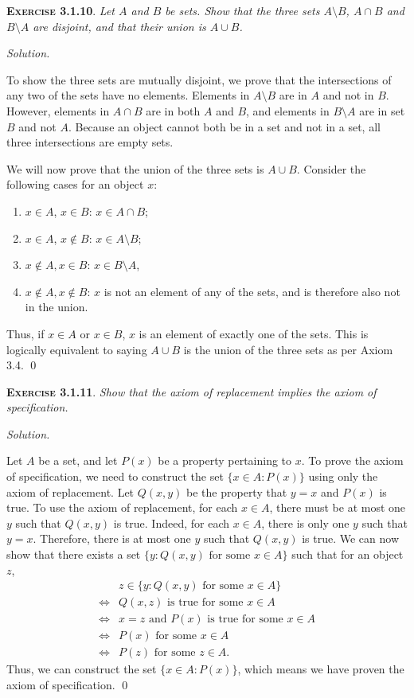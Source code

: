 \documentclass[12pt]{article}
\theoremstyle{remark}
\newenvironment{exer}[2]{
    \noindent \setlength{\parskip}{1em}%
    \textsc{\textbf{Exercise #1}}. \textit{#2} \par
    \noindent \textit{Solution.} %
}{\bigskip}
\begin{document}
\begin{exer}{3.1.10}{
    Let $A$ and $B$ be sets.
    Show that the three sets $A \setminus B$, $A \cap B$ and $B \setminus A$ are disjoint, and that their union is $A \cup B$.
}
    To show the three sets are mutually disjoint, we prove that the intersections of any two of the sets have no elements.
    Elements in $A \setminus B$ are in $A$ and not in $B$.
    However, elements in $A \cap B$ are in both $A$ and $B$,
    and elements in $B \setminus A$ are in set $B$ and not $A$.
    Because an object cannot both be in a set and not in a set, all three intersections are empty sets.

    We will now prove that the union of the three sets is $A \cup B$.
    Consider the following cases for an object $x$:
    \begin{enumerate}[topsep=0mm, label=(\alph*)]
        \item $x \in A$, $x \in B$: $x \in A \cap B$;
        \item $x \in A$, $x \notin B$: $x \in A \setminus B$;
        \item $x \notin A, x \in B$: $x \in B \setminus A$,
        \item $x \notin A, x \notin B$: $x$ is not an element of any of the sets, and is therefore also not in the union.
    \end{enumerate}
    Thus, if $x \in A$ or $x \in B$, $x$ is an element of exactly one of the sets.
    This is logically equivalent to saying $A \cup B$ is the union of the three sets as per Axiom 3.4. \qed
\end{exer}


\begin{exer}{3.1.11}{Show that the axiom of replacement implies the axiom of specification.}
    Let $A$ be a set, and let $P(x)$ be a property pertaining to $x$.
    To prove the axiom of specification, we need to construct the set $\{x \in A: P(x) \}$ using only the axiom of replacement.
    Let $Q(x, y)$ be the property that $y = x$ and $P(x)$ is true.
    To use the axiom of replacement, for each $x \in A$, there must be at most one $y$ such that $Q(x, y)$ is true.
    Indeed, for each $x \in A$, there is only one $y$ such that $y = x$.
    Therefore, there is at most one $y$ such that $Q(x, y)$ is true.
    We can now show that there exists a set $\{y : Q(x, y) \text{ for some } x \in A \}$ such that for an object $z$,
    \begin{align*}
             & z \in \{y : Q(x, y) \text{ for some } x \in A \} \\
        \iff & Q(x, z) \text{ is true for some } x \in A \\
        \iff & x = z \text{ and } P(x) \text{ is true for some } x \in A \\
        \iff & P(x) \text{ for some } x \in A \\
        \iff & P(z) \text{ for some } z \in A.
    \end{align*}
    Thus, we can construct the set $\{x \in A: P(x) \}$, which means we have proven the axiom of specification. \qed
\end{exer}
\end{document}
